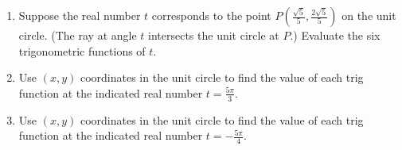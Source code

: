 \begin{enumerate}

\item Suppose the real number $t$ corresponds to the point
  $P\left(\frac{\sqrt{5}}{5}, \frac{2\sqrt{5}}{5}\right)$ on the unit
  circle.  (The ray at angle $t$ intersects the unit circle at $P$.)
  Evaluate the six trigonometric functions of $t$.
  
  \begin{enumerate} [itemsep=3em]
  \end{enumerate}


\item Use $(x,y)$ coordinates in the unit circle to find the value of
  each trig function at the indicated real number $t=\frac{5\pi}{3}$. 
  \begin{enumerate}[itemsep=3em]
  \end{enumerate}

\clearpage

\item Use $(x,y)$ coordinates in the unit circle to find the value of each trig function at the indicated real number $t=-\frac{5\pi}{4}$.
\begin{enumerate} [itemsep=5em]
\end{enumerate}


\end{enumerate}

